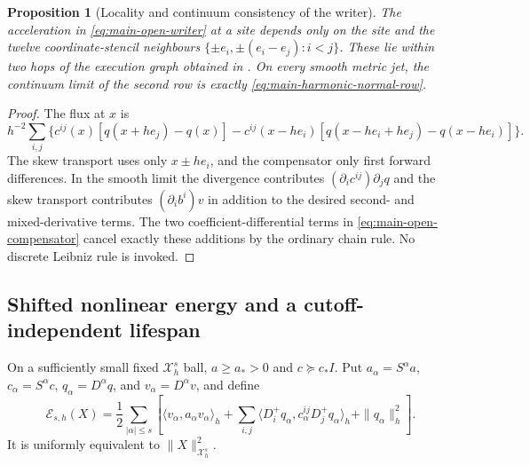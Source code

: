 \documentclass[11pt]{article}
\newtheorem{proposition}[proposition]{Proposition}
\theoremstyle{definition}
\theoremstyle{remark}
\begin{document}
\begin{proposition}[Locality and continuum consistency of the writer]
\label{prop:supp-open-locality}
The acceleration in \eqref{eq:main-open-writer} at a site depends only on the
site and the twelve coordinate-stencil neighbours
$\{\pm e_i,\pm(e_i-e_j):i<j\}$.  These lie within two hops of the execution
graph obtained in .  On every smooth metric jet,
the continuum limit of the second row is exactly
\eqref{eq:main-harmonic-normal-row}.
\end{proposition}
\begin{proof}
The flux at $x$ is
\[
 h^{-2}\sum_{i,j}\{c^{ij}(x)[q(x+he_j)-q(x)]
 -c^{ij}(x-he_i)[q(x-he_i+he_j)-q(x-he_i)]\}.
\]
The skew transport uses only $x\pm he_i$, and the compensator only first
forward differences.  In the smooth limit the divergence contributes
$(\partial_ic^{ij})\partial_jq$ and the skew transport contributes
$(\partial_ib^i)v$ in addition to the desired second- and mixed-derivative
terms.  The two coefficient-differential terms in
\eqref{eq:main-open-compensator} cancel exactly these additions by the
ordinary chain rule.  No discrete Leibniz rule is invoked.
\end{proof}

\subsection{Shifted nonlinear energy and a cutoff-independent lifespan}

On a sufficiently small fixed $\mathcal X_h^s$ ball, $a\ge a_*>0$ and
$c\succeq c_*I$.  Put
$a_\alpha=S^\alpha a$, $c_\alpha=S^\alpha c$,
$q_\alpha=D^\alpha q$, and $v_\alpha=D^\alpha v$, and define
\begin{equation}
 \boxed{\mathscr E_{s,h}(X)=\frac12\sum_{|\alpha|\le s}
 \left[\langle v_\alpha,a_\alpha v_\alpha\rangle_h
 +\sum_{i,j}\langle D_i^+q_\alpha,c_\alpha^{ij}D_j^+q_\alpha\rangle_h
 +\|q_\alpha\|_h^2\right].}
 \label{eq:supp-open-energy}
\end{equation}
It is uniformly equivalent to $\|X\|_{\mathcal X_h^s}^2$.
\end{document}
